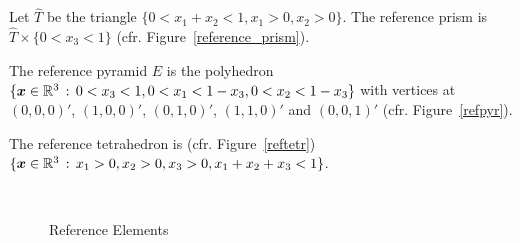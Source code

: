 \begin{defi}\label{defi_of_ref_prism}
  Let $\hat T$ be the triangle $\{ 0 < x_1 + x_2 < 1, x_1 > 0, x_2 > 0 \}$. 
  The reference prism is 
  $\hat T\times\{ 0 < x_3 < 1 \}$ (cfr. Figure~\ref{reference_prism}).
\end{defi}
\begin{defi}\label{defi_of_ref_pyr}
The reference pyramid $\hat E$ is the polyhedron 
$\{\boldsymbol{x}\in\mathbb{R}^3\,:\,0< x_3< 1,
0<  x_1<  1-x_3, 0<  x_2<  1-x_3\}$
with vertices at $(0,0,0)'$,
$(1,0,0)'$, $(0,1,0)'$, $(1,1,0)'$ and $(0,0,1)'$ (cfr. Figure~\ref{refpyr}).
\end{defi}
\begin{defi}\label{def_of_ref_elems}
The reference tetrahedron is (cfr. Figure~\ref{reftetr})
$\{\boldsymbol{x}\in\mathbb{R}^3\,:\,x_1 > 0, x_2 > 0, x_3 > 0, x_1+x_2+x_3 < 1\}$.
\end{defi}

\begin{figure}
	\centering
  \hspace{1cm}
  \\
  \hspace{1cm}
	\caption{Reference Elements}
\end{figure}
